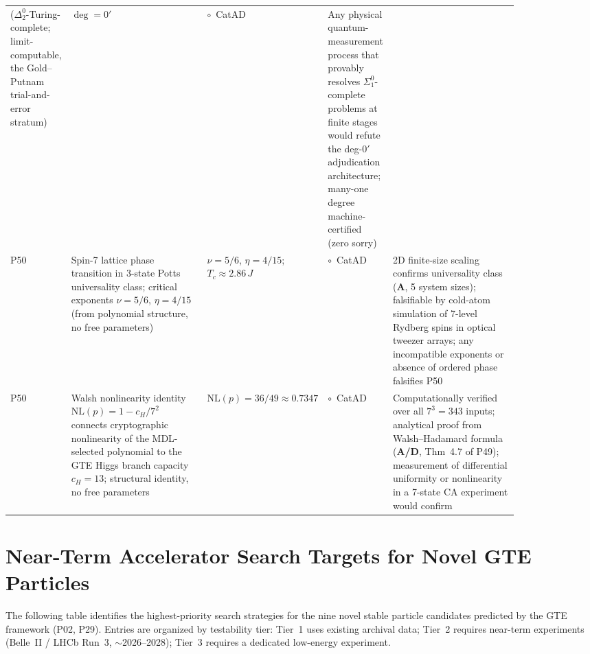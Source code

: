 \documentclass[11pt]{article}
\newcommand{\CatAD}{\textbf{A/D}}
\newcommand{\CatA}{\textbf{A}}
\begin{document}
\begin{longtable}{@{}P{0.08\linewidth}P{0.27\linewidth}P{0.16\linewidth}P{0.10\linewidth}P{0.25\linewidth}@{}}
  ($\Delta_2^0$-Turing-complete; limit-computable, the Gold--Putnam
  trial-and-error stratum)
  & $\deg = 0'$ & $\circ$~CatAD
  & Any physical quantum-measurement process that provably resolves
    $\Sigma_1^0$-complete problems at finite stages would refute the
    deg-$0'$ adjudication architecture; many-one degree machine-certified
    (zero sorry) \\
%
P50 & Spin-7 lattice phase transition in 3-state Potts universality class;
  critical exponents $\nu = 5/6$, $\eta = 4/15$ (from polynomial structure,
  no free parameters)
  & $\nu = 5/6$, $\eta = 4/15$; $T_c \approx 2.86\,J$
  & $\circ$~CatAD
  & 2D finite-size scaling confirms universality class (\CatA, 5 system sizes);
    falsifiable by cold-atom simulation of 7-level Rydberg spins in optical
    tweezer arrays; any incompatible exponents or absence of ordered phase
    falsifies P50 \\
P50 & Walsh nonlinearity identity $\mathrm{NL}(p) = 1 - c_H/7^2$ connects
  cryptographic nonlinearity of the MDL-selected polynomial to the GTE
  Higgs branch capacity $c_H = 13$; structural identity, no free parameters
  & $\mathrm{NL}(p) = 36/49 \approx 0.7347$
  & $\circ$~CatAD
  & Computationally verified over all $7^3 = 343$ inputs; analytical proof
    from Walsh--Hadamard formula (\CatAD, Thm~4.7 of P49); measurement of
    differential uniformity or nonlinearity in a 7-state CA experiment would
    confirm \\
\end{longtable}

\normalsize

\section{Near-Term Accelerator Search Targets for Novel GTE Particles}
\label{app:search_targets}

The following table identifies the highest-priority search strategies for the
nine novel stable particle candidates predicted by the GTE framework (P02, P29).
Entries are organized by testability tier: Tier~1 uses existing archival data;
Tier~2 requires near-term experiments (Belle~II / LHCb Run~3, $\sim$2026--2028);
Tier~3 requires a dedicated low-energy experiment.



\end{document}
